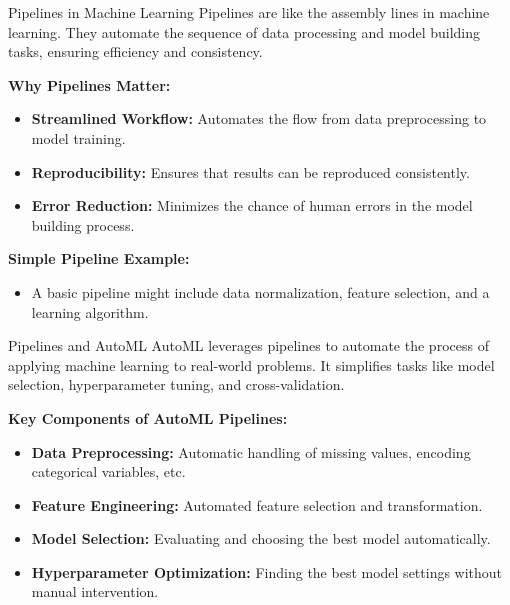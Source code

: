 \documentclass[11pt,compress,t,notes=noshow, xcolor=table]{beamer}
\begin{document}
\begin{vbframe}{Pipelines in Machine Learning}
Pipelines are like the assembly lines in machine learning. They automate the sequence of data processing and model building tasks, ensuring efficiency and consistency.

\textbf{Why Pipelines Matter:}
\begin{itemize}
\item \small \textbf{Streamlined Workflow:} Automates the flow from data preprocessing to model training.
\item \small \textbf{Reproducibility:} Ensures that results can be reproduced consistently.
\item \small \textbf{Error Reduction:} Minimizes the chance of human errors in the model building process.
\end{itemize}

\textbf{Simple Pipeline Example:}
\begin{itemize}
\item A basic pipeline might include data normalization, feature selection, and a learning algorithm.
\end{itemize}
\end{vbframe}

\begin{vbframe}{Pipelines and AutoML}
AutoML leverages pipelines to automate the process of applying machine learning to real-world problems. It simplifies tasks like model selection, hyperparameter tuning, and cross-validation.

\vspace{1em}

\textbf{Key Components of AutoML Pipelines:}
\begin{itemize}
\item \small \textbf{Data Preprocessing:} Automatic handling of missing values, encoding categorical variables, etc.
\item \small \textbf{Feature Engineering:} Automated feature selection and transformation.
\item \small \textbf{Model Selection:} Evaluating and choosing the best model automatically.
\item \small \textbf{Hyperparameter Optimization:} Finding the best model settings without manual intervention.
\end{itemize}
\end{vbframe}

\endlecture
\end{document}
